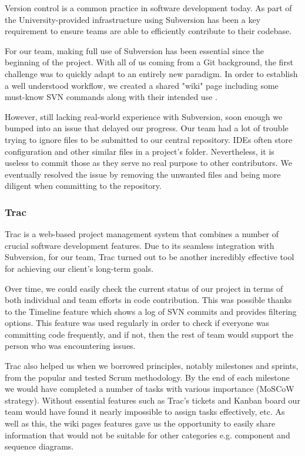 \documentclass{l3proj}
\begin{document}
    Version control is a common practice in software development today. As part of the University-provided infrastructure using Subversion has been a key requirement to ensure teams are able to efficiently contribute to their codebase.
    
    For our team, making full use of Subversion has been essential since the beginning of the project. With all of us coming from a Git background, the first challenge was to quickly adapt to an entirely new paradigm. In order to establish a well understood workflow, we created a shared "wiki" page including some must-know SVN commands along with their intended use \cite{SVN}. 
    
    However, still lacking real-world experience with Subversion, soon enough we bumped into an issue that delayed our progress. Our team had a lot of trouble trying to ignore files to be submitted to our central repository. IDEs often store configuration and other similar files in a project's folder. Nevertheless, it is useless to commit those as they serve no real purpose to other contributors. We eventually resolved the issue by removing the unwanted files and being more diligent when committing to the repository.
    
    
\subsubsection{Trac}
\label{sec:trac}

Trac is a web-based project management system that combines a number of crucial software development features. Due to its seamless integration with Subversion, for our team, Trac turned out to be another incredibly effective tool for achieving our client's long-term goals. 

Over time, we could easily check the current status of our project in terms of both individual and team efforts in code contribution. This was possible thanks to the Timeline feature which shows a log of SVN commits and provides filtering options. This feature was used regularly in order to check if everyone was committing code frequently, and if not, then the rest of team would support the person who was encountering issues.

Trac also helped us when we borrowed principles, notably milestones and sprints, from the popular and tested Scrum methodology. By the end of each milestone we would have completed a number of tasks with various importance (MoSCoW strategy). Without essential features such as Trac's tickets and Kanban board our team would have found it nearly impossible to assign tasks effectively, etc. As well as this, the wiki pages features gave us the opportunity to easily share information that would not be suitable for other categories e.g. component and sequence diagrams.
    
\end{document}

